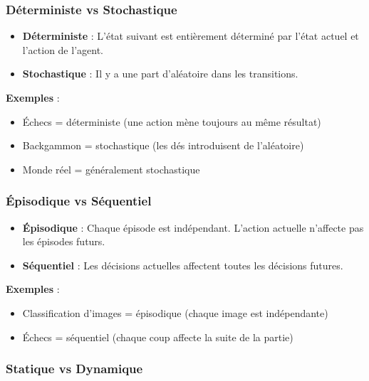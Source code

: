 \documentclass[11pt,a4paper]{article}
\begin{document}
\subsubsection{Déterministe vs Stochastique}

\begin{definitionbox}
\begin{itemize}
    \item \textbf{Déterministe} : L'état suivant est entièrement déterminé par l'état actuel et l'action de l'agent.
    \item \textbf{Stochastique} : Il y a une part d'aléatoire dans les transitions.
\end{itemize}
\end{definitionbox}

\textbf{Exemples} :
\begin{itemize}
    \item Échecs = déterministe (une action mène toujours au même résultat)
    \item Backgammon = stochastique (les dés introduisent de l'aléatoire)
    \item Monde réel = généralement stochastique
\end{itemize}

\subsubsection{Épisodique vs Séquentiel}

\begin{definitionbox}
\begin{itemize}
    \item \textbf{Épisodique} : Chaque épisode est indépendant. L'action actuelle n'affecte pas les épisodes futurs.
    \item \textbf{Séquentiel} : Les décisions actuelles affectent toutes les décisions futures.
\end{itemize}
\end{definitionbox}

\textbf{Exemples} :
\begin{itemize}
    \item Classification d'images = épisodique (chaque image est indépendante)
    \item Échecs = séquentiel (chaque coup affecte la suite de la partie)
\end{itemize}

\subsubsection{Statique vs Dynamique}
\end{document}
